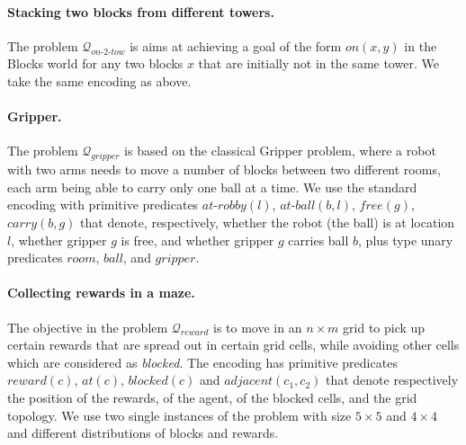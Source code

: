 \documentclass[letterpaper]{article} %
\newcommand{\Q}{\mathcal{Q}}
\begin{document}
% 

% 

\paragraph{Stacking two blocks from different towers.}
The problem $\Q_{on\text{-}2\text{-}tow}$ is aims at achieving a goal of the form $on(x,y)$
in the Blocks world for any two blocks $x$ that are initially not in the same tower.
We take the same encoding as above.





\paragraph{Gripper.}
The problem $\Q_{gripper}$ is based on the classical Gripper problem, where a robot with two arms needs to 
move a number of blocks between two different rooms, each arm being able to carry only one ball at a time.
We use the standard encoding with primitive predicates $at\text{-}robby(l)$, $at\text{-}ball(b, l)$, $free(g)$, $carry(b, g)$ that denote,
respectively, whether the robot (the ball) is at location $l$, whether gripper $g$ is free, and whether gripper $g$ carries ball $b$,
plus type unary predicates $room$, $ball$, and $gripper$.



\paragraph{Collecting rewards in a maze.}
The objective in the problem $\Q_{reward}$ is to move in an $n \times m$ grid to pick up certain
rewards that are spread out in certain grid cells, while avoiding other cells which are considered as \emph{blocked}.
The encoding has primitive predicates $reward(c)$, $at(c)$, $blocked(c)$ and $adjacent(c_1, c_2)$ that denote
respectively the position of the rewards, of the agent, of the blocked cells, and the grid topology.
We use two single instances of the problem with size $5 \times 5$ and $4 \times 4$ and different distributions of blocks and rewards.
\end{document}
